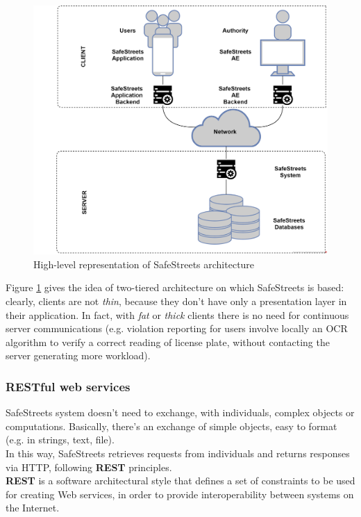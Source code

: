 \documentclass{article}
\begin{document}
				\begin{figure}[H]
					\centering
					\includegraphics [width=\textwidth] {diagrams/tieredArchitecture.png}
					\caption[Architecture]{High-level representation of SafeStreets architecture}
					\label{fig:tieredArchitecture}
				\end{figure}
			
				Figure \ref{fig:tieredArchitecture} gives the idea of two-tiered architecture on which SafeStreets is based: clearly, clients are not \textit{thin}, because they don't have only a presentation layer in their application.
				In fact, with \textit{fat} or \textit{thick} clients there is no need for continuous server communications (e.g. violation reporting for users involve locally an OCR algorithm to verify a correct reading of license plate, without contacting the server generating more workload).
			
			\subsubsection{RESTful web services}
				SafeStreets system doesn't need to exchange, with individuals, complex objects or computations. Basically, there's an exchange of simple objects, easy to format (e.g. in strings, text, file).\\
				In this way, SafeStreets retrieves requests from individuals and returns responses via HTTP, following \textbf{REST} principles.\\
				\textbf{REST} is a software architectural style that defines a set of constraints to be used for creating Web services, in order to provide interoperability between systems on the Internet. 
				
\end{document}
